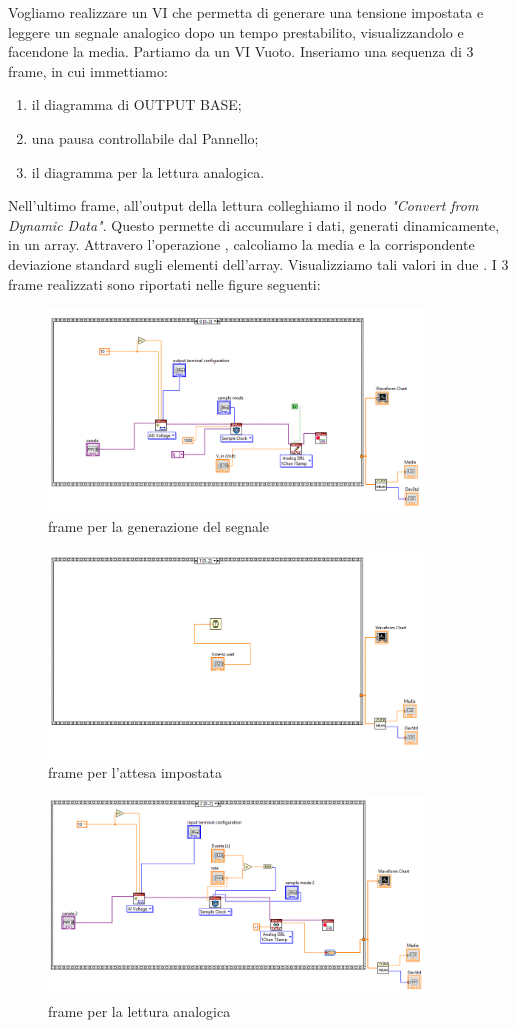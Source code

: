 Vogliamo realizzare un VI che permetta di generare una tensione impostata e leggere un segnale analogico dopo un tempo prestabilito, visualizzandolo e facendone la media.
Partiamo da un VI Vuoto. Inseriamo una sequenza di 3 frame, in cui immettiamo:
\begin{enumerate}
  \item il diagramma di OUTPUT BASE;
  \item una pausa controllabile dal Pannello;
  \item il diagramma per la lettura analogica.
\end{enumerate}

Nell'ultimo frame, all'output della lettura colleghiamo il nodo \textit{"Convert from Dynamic Data"}. Questo permette di accumulare i dati, generati dinamicamente, in un array. Attravero l'operazione , calcoliamo la media e la corrispondente deviazione standard sugli elementi dell'array. Visualizziamo tali valori in due .
I 3 frame realizzati sono riportati nelle figure seguenti:
\begin{figure}[H]
\caption{frame per la generazione del segnale}
    \includegraphics[width=10cm]{settimana_1/immagini/MXVinVout0su2.png}
    \centering
\end{figure}
\begin{figure}[H]
\caption{frame per l'attesa impostata}
    \includegraphics[width=10cm]{settimana_1/immagini/MXVinVout1su2.png}
    \centering
\end{figure}
\begin{figure}[H]
\caption{frame per la lettura analogica}
    \includegraphics[width=10cm]{settimana_1/immagini/MXVinVout2su2.png}
    \centering
\end{figure}